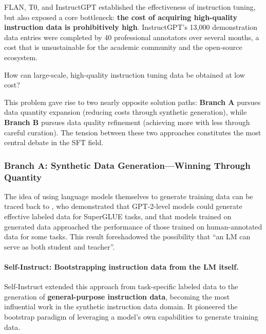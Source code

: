 FLAN, T0, and InstructGPT established the effectiveness of instruction tuning,
but also exposed a core bottleneck: \textbf{the cost of acquiring high-quality instruction data is prohibitively high}.
InstructGPT's 13,000 demonstration data entries were completed by 40 professional annotators over several months,
a cost that is unsustainable for the academic community and the open-source ecosystem.

\begin{problembox}
How can large-scale, high-quality instruction tuning data be obtained at low cost?
\end{problembox}

This problem gave rise to two nearly opposite solution paths:
\textbf{Branch A} pursues data quantity expansion (reducing costs through synthetic generation),
while \textbf{Branch B} pursues data quality refinement (achieving more with less through careful curation).
The tension between these two approaches constitutes the most central debate in the SFT field.



\subsubsection{Branch A: Synthetic Data Generation---Winning Through Quantity}
\label{sec:t1-synthetic}

The idea of using language models themselves to generate training data can be traced back to
\citet{schick2021generating}, who demonstrated that GPT-2-level models
could generate effective labeled data for SuperGLUE tasks,
and that models trained on generated data approached the performance of those trained on human-annotated data for some tasks.
This result foreshadowed the possibility that ``an LM can serve as both student and teacher''.

\paragraph{Self-Instruct: Bootstrapping instruction data from the LM itself.}
Self-Instruct extended this approach from task-specific labeled data to the generation of \textbf{general-purpose instruction data},
becoming the most influential work in the synthetic instruction data domain.
It pioneered the bootstrap paradigm of leveraging a model's own capabilities to generate training data.

